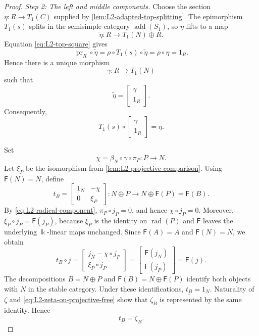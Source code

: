 \documentclass[a4paper,11pt,reqno]{amsart}
\theoremstyle{definition}
\theoremstyle{plain}
\numberwithin{equation}{section}
\newcommand{\kk}{\Bbbk}
\begin{document}
\begin{proof}
\smallskip\noindent\emph{Step 2: The left and middle components.}
Choose the section \(\eta:R\to T_1(C)\) supplied by
\cref{lem:L2-adapted-top-splitting}.  The epimorphism \(T_1(s)\) splits
in the semisimple category \(\operatorname{add}(S_1)\), so \(\eta\)
lifts to a map
\[
 \widetilde\eta:R\longrightarrow T_1(N)\oplus R.
\]
Equation \eqref{eq:L2-top-square} gives
\[
 \operatorname{pr}_R\circ\widetilde\eta
 =\rho\circ T_1(s)\circ\widetilde\eta
 =\rho\circ\eta
 =1_R.
\]
Hence there is a unique morphism
\[
 \gamma:R\longrightarrow T_1(N)
\]
such that
\[
 \widetilde\eta=
 \begin{bmatrix}\gamma\\1_R\end{bmatrix}.
\]
Consequently,
\begin{equation}
\label{eq:L2-top-lift}
 T_1(s)\circ
 \begin{bmatrix}\gamma\\1_R\end{bmatrix}=\eta.
\end{equation}

Set
\[
 \chi=\beta_N\circ\gamma\circ\pi_P:P\longrightarrow N.
\]
Let \(\xi_P\) be the isomorphism from
\cref{lem:L2-projective-comparison}.  Using \(\mathsf F(N)=N\), define
\begin{equation}
\label{eq:L2-middle-comparison}
 t_B=
 \begin{bmatrix}
  1_N&-\chi\\
  0&\xi_P
 \end{bmatrix}:
 N\oplus P\longrightarrow N\oplus\mathsf F(P)=\mathsf F(B).
\end{equation}
By \eqref{eq:L2-radical-component},
\(\pi_P\circ j_P=0\), and hence \(\chi\circ j_P=0\).  Moreover,
\(\xi_P\circ j_P=\mathsf F(j_P)\), because \(\xi_P\) is the identity
on \(\operatorname{rad}(P)\) and \(\mathsf F\) leaves the underlying
\(\kk\)-linear maps unchanged.  Since \(\mathsf F(A)=A\) and
\(\mathsf F(N)=N\), we obtain
\begin{equation}
\label{eq:L2-left-comparison}
 t_B\circ j
 =
 \begin{bmatrix}
  j_N-\chi\circ j_P\\
  \xi_P\circ j_P
 \end{bmatrix}
 =
 \begin{bmatrix}
  \mathsf F(j_N)\\
  \mathsf F(j_P)
 \end{bmatrix}
 =\mathsf F(j).
\end{equation}
The decompositions \(B=N\oplus P\) and
\(\mathsf F(B)=N\oplus\mathsf F(P)\) identify both objects with \(N\) in
the stable category.  Under these identifications,
\(\underline{t_B}=1_{\underline N}\).  Naturality of \(\zeta\) and
\eqref{eq:L2-zeta-on-projective-free} show that \(\zeta_B\) is represented
by the same identity.  Hence
\begin{equation}
\label{eq:L2-stable-middle-comparison}
 \underline{t_B}=\zeta_B.
\end{equation}


\end{proof}
\end{document}

